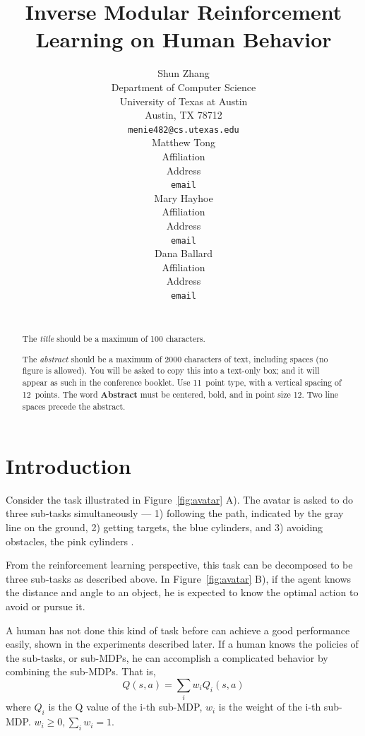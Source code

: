 \documentclass[11pt]{article} %
\title{Inverse Modular Reinforcement Learning on Human Behavior}
\author{
Shun Zhang\\
Department of Computer Science\\
University of Texas at Austin\\
Austin, TX 78712 \\
\texttt{menie482@cs.utexas.edu} \\
\And
Matthew Tong \\
Affiliation \\
Address \\
\texttt{email} \\
\And
Mary Hayhoe \\
Affiliation \\
Address \\
\texttt{email} \\
\And
Dana Ballard \\
Affiliation \\
Address \\
\texttt{email} \\
\\
}
\begin{document}
\maketitle

\begin{abstract}
The \emph{title} should be a maximum of 100 characters. 

The \emph{abstract} should be a maximum of 2000 characters of text,
including spaces (no figure is allowed). You will be asked to copy
this into a text-only box; and it will appear as such in the
conference booklet. Use 11~point type, with a vertical spacing of
12~points.  The word \textbf{Abstract} must be centered, bold, and in
point size 12. Two line spaces precede the abstract.
\end{abstract}




\startmain %

\section{Introduction}

Consider the task illustrated in Figure~\ref{fig:avatar} A). The avatar is asked to
do three sub-tasks simultaneously --- 1) following the path, indicated by the gray
line on the ground, 2) getting targets, the blue cylinders, and 3) avoiding
obstacles, the pink cylinders \cite{rothkopf2013modular}.

From the reinforcement learning perspective, this task can be decomposed to be
three sub-tasks as described above.  In Figure~\ref{fig:avatar} B), if the agent
knows the distance and angle to an object, he is expected to know the optimal
action to avoid or pursue it.

A human has not done this kind of task before can achieve a good performance
easily, shown in the experiments described later. If a human knows the policies
of the sub-tasks, or sub-MDPs, he can accomplish a complicated behavior by
combining the sub-MDPs. That is,
$$Q(s, a) = \sum_i w_i Q_i (s, a)$$
where $Q_i$ is the Q value of the i-th sub-MDP, $w_i$ is the weight of the i-th
sub-MDP. $w_i \geq 0, \sum_i w_i = 1$.

\end{document}
